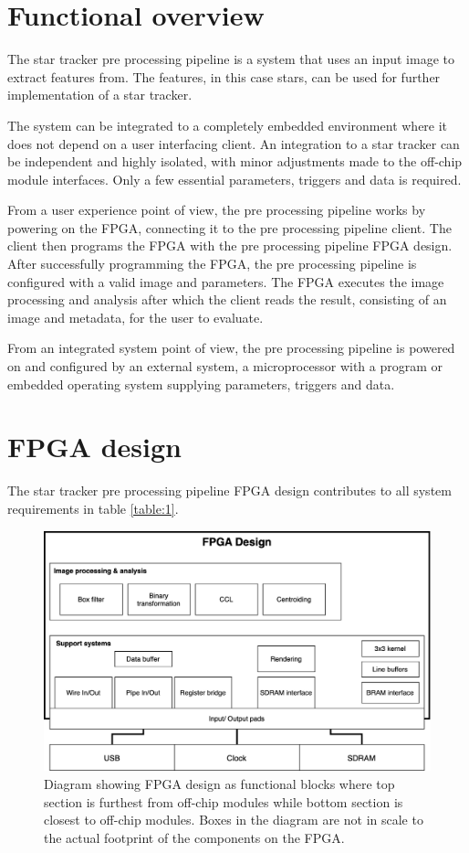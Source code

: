 \documentclass[12pt]{report}
\begin{document}
\section{Functional overview}
The star tracker pre processing pipeline is a system that uses an input image to extract features from. The features, in this case stars, can be used for further implementation of a star tracker.
\par
The system can be integrated to a completely embedded environment where it does not depend on a user interfacing client. 
An integration to a star tracker can be independent and highly isolated, with minor adjustments made to the off-chip module interfaces. Only a few essential parameters, triggers and data is required.  
\par
From a user experience point of view, the pre processing pipeline works by powering on the FPGA, connecting it to the pre processing pipeline client. The client then programs the FPGA with the pre processing pipeline FPGA design. After successfully programming the FPGA, the pre processing pipeline is configured with a valid image and parameters. The FPGA executes the image processing and analysis after which the client reads the result, consisting of an image and metadata, for the user to evaluate.
\par
From an integrated system point of view, the pre processing pipeline is powered on and configured by an external system, a microprocessor with a program or embedded operating system supplying parameters, triggers and data. 

\section{FPGA design}

The star tracker pre processing pipeline FPGA design contributes to all system requirements in table \ref*{table:1}.

\begin{figure}[h]
    \centering
    \includegraphics[scale=0.25]{figures/fpga_design.png}
    \caption{Diagram showing FPGA design as functional blocks where top section is furthest from off-chip modules while bottom section is closest to off-chip modules. Boxes in the diagram are not in scale to the actual footprint of the components on the FPGA.}
    \label{fig:fpga_design}
\end{figure}
\end{document}
